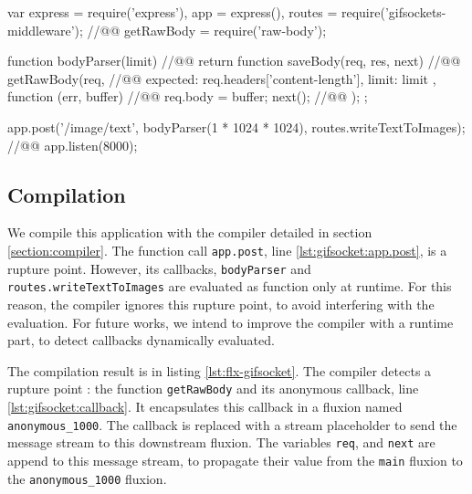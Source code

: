 
\begin{code}[js, caption={Simplified version of gifsockets-server},label={lst:gifsocket}]
var express = require('express'),
    app = express(),
    routes = require('gifsockets-middleware'); //@\label{lst:gifsocket:gif-mw}@
    getRawBody = require('raw-body');

function bodyParser(limit) { //@\label{lst:gifsocket:bodyParser}@
  return function saveBody(req, res, next) { //@\label{lst:gifsocket:saveBody}@
    getRawBody(req, { //@\label{lst:gifsocket:getRawBody}@
      expected: req.headers['content-length'],
      limit: limit
    }, function (err, buffer) { //@\label{lst:gifsocket:callback}@
      req.body = buffer;
      next(); //@\label{lst:gifsocket:next}@
    });
  };
}

app.post('/image/text', bodyParser(1 * 1024 * 1024), routes.writeTextToImages); //@\label{lst:gifsocket:app.post}@
app.listen(8000);
\end{code}


\subsection{Compilation}

We compile this application with the compiler detailed in section \ref{section:compiler}.
The function call \texttt{app.post}, line \ref{lst:gifsocket:app.post}, is a rupture point.
However, its callbacks, \texttt{bodyParser} and \texttt{routes.write\-Text\-To\-Images} are evaluated as function only at runtime.
For this reason, the compiler ignores this rupture point, to avoid interfering with the evaluation.
For future works, we intend to improve the compiler with a runtime part, to detect callbacks dynamically evaluated. 

The compilation result is in listing \ref{lst:flx-gifsocket}.
The compiler detects a rupture point : the function \texttt{getRawBody} and its anonymous callback, line \ref{lst:gifsocket:callback}.
It encapsulates this callback in a fluxion named \texttt{anonymous\-\_1000}.
The callback is replaced with a stream placeholder to send the message stream to this downstream fluxion.
The variables \texttt{req}, and \texttt{next} are append to this message stream, to propagate their value from the \texttt{main} fluxion to the \texttt{anonymous\-\_1000} fluxion.

